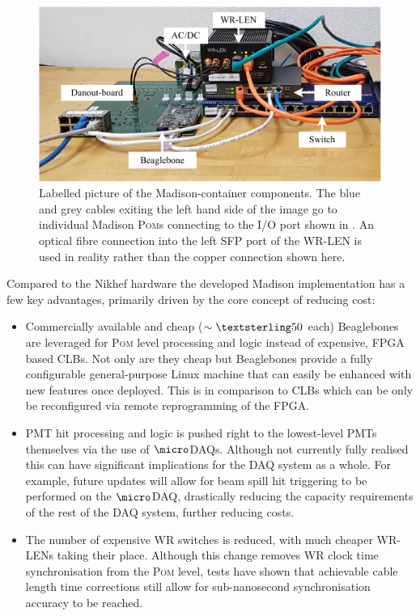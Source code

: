 \begin{figure} %
    \includegraphics[width=\textwidth]{diagrams/5-daq/madison_box.pdf}
    \caption[Labelled picture of the Madison-container components]
    {Labelled picture of the Madison-container components. The blue and grey cables exiting the
        left hand side of the image go to individual Madison \textsc{Pom}s connecting to the I/O
        port shown in . An optical fibre connection into the left SFP
        port of the WR-LEN is used in reality rather than the copper connection shown here.}
    \label{fig:madison_box}
\end{figure}

Compared to the Nikhef hardware the \chips developed Madison implementation has a few key
advantages, primarily driven by the core \chips concept of reducing cost:
\begin{itemize}
    \item Commercially available and cheap ($\sim\textsterling50$ each) Beaglebones are leveraged
    for \textsc{Pom} level processing and logic instead of expensive, FPGA based CLBs. Not only
    are they cheap but Beaglebones provide a fully configurable general-purpose Linux machine that
    can easily be enhanced with new features once deployed. This is in comparison to CLBs which
    can be only be reconfigured via remote reprogramming of the FPGA.

    \item PMT hit processing and logic is pushed right to the lowest-level PMTs themselves via the
    use of $\micro$DAQs. Although not currently fully realised this can have significant
    implications for the DAQ system as a whole. For example, future updates will allow for beam
    spill hit triggering to be performed on the $\micro$DAQ, drastically reducing the capacity
    requirements of the rest of the DAQ system, further reducing costs.

    \item The number of expensive WR switches is reduced, with much cheaper WR-LENs taking their
    place. Although this change removes WR clock time synchronisation from the \textsc{Pom} level,
    tests have shown that achievable cable length time corrections still allow for sub-nanosecond
    synchronisation accuracy to be reached.
\end{itemize}

